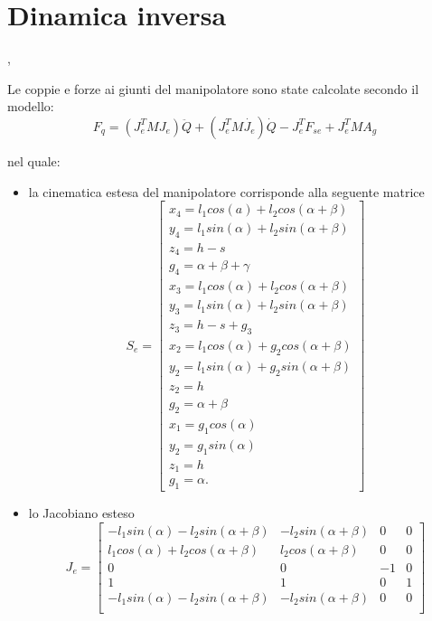 \newpage
\section{Dinamica inversa},
\label{chapter:dinamica_inversa}
\graphicspath{{media/2_kin_din/3_din_inv}}

Le coppie e forze ai giunti del manipolatore sono state calcolate secondo il modello:
\[ F_{q} = \left( J_e^{T}MJ_e \right) \ddot{Q}+\left( J_e^{T}M\dot{J_e} \right) \dot{Q} -J_e^{T}F_{se} + J_e^{T} M A_g\]



nel quale:
\begin{itemize}
	\item la cinematica estesa del manipolatore corrisponde alla seguente matrice 
	\[ S_e=
	\begin{bmatrix}
		x_4 = l_1cos(a)+l_2cos(\alpha+\beta)\\
		y_4 = l_1sin(\alpha)+l_2sin(\alpha+\beta)\\
		z_4 = h-s\\
		g_4 = \alpha+\beta+\gamma\\
		x_3 = l_1cos(\alpha)+l_2cos(\alpha+\beta)\\
		y_3 = l_1sin(\alpha)+l_2sin(\alpha+\beta)\\
		z_3 = h-s+g_3\\
		x_2 = l_1cos(\alpha)+g_2cos(\alpha+\beta)\\
		y_2 = l_1sin(\alpha)+g_2sin(\alpha+\beta)\\
		z_2 = h\\
		g_2 = \alpha+\beta\\
		x_1 = g_1cos(\alpha)\\
		y_2 = g_1sin(\alpha)\\
		z_1 = h\\
		g_1 = \alpha.
	\end{bmatrix}
	\]
	\item lo Jacobiano esteso 
	\[  J_e =
	\begin{bmatrix}
		-l_1sin(\alpha)-l_2sin(\alpha+\beta) & -l_2sin(\alpha+\beta) & 0 & 0 \\
		l_1cos(\alpha)+l_2cos(\alpha+\beta) & l_2cos(\alpha+\beta) & 0 & 0\\
		0 & 0 & -1 & 0\\
		1 & 1 & 0 & 1\\
		-l_1sin(\alpha)-l_2sin(\alpha+\beta) & -l_2sin(\alpha+\beta) & 0 & 0\\

\end{bmatrix}\]
\end{itemize}
